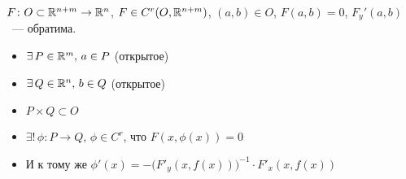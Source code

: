 \begin{Theorem*}
    $F\colon O\subset\rmy[n+m]\to\rmy[n]$, $F\in C^r(O, \rmy[n+m])$, $(a,b)\in O$, $F(a,b)=0$, $F_y'(a,b)$~--- обратима.
    
    \THEN \begin{itemize}
        \item $\exists\,P\in\rmy[m],\,a\in P$ (открытое)
        \item $\exists\,Q\in\rmy[n],\,b\in Q$ (открытое)
        \item $P\times Q\subset O$
        \item $\exists!\,\phi\colon P\to Q,\,\phi\in C^r$, что $F(x,\phi(x))=0$
        \item И к тому же $\phi'(x)=-\bigl(F'_y(x,f(x))\bigr)^{-1}\cdot F'_x(x, f(x))$
    \end{itemize}
\end{Theorem*}
